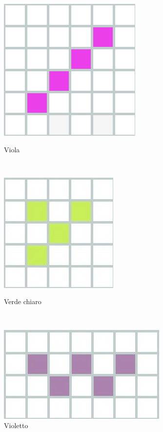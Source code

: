 \begin{figure}[h]
	
	\begin{minipage}{3.5cm}
		\centering
		\includegraphics[scale=0.30]{immagini/i}
		\caption{Viola}
		\label{i}
	\end{minipage}
	\ \hspace{2mm} \hspace{3mm} \
	\begin{minipage}{3.5cm}
		\centering
		\includegraphics[scale=0.25]{immagini/T}
		\caption{Verde chiaro}
		\label{t}
	\end{minipage}
	\ \hspace{2mm} \hspace{3mm} \
	\begin{minipage}{3.5cm}
		\centering
		\includegraphics[scale=0.25]{immagini/w}
		\caption{Violetto}
		\label{w}
	\end{minipage}
\end{figure}

